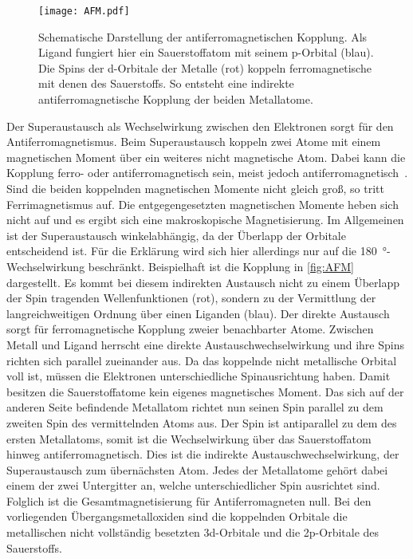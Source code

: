         \begin{figure}[H]
            \centering
            \texttt{[image: AFM.pdf]}
            \caption{Schematische Darstellung der antiferromagnetischen Kopplung.
            Als Ligand fungiert hier ein Sauerstoffatom mit seinem p-Orbital (blau).
            Die Spins der d-Orbitale der Metalle (rot) koppeln ferromagnetische mit denen des Sauerstoffs.
            So entsteht eine indirekte antiferromagnetische Kopplung der beiden Metallatome.}
            \label{fig:AFM}
        \end{figure}
        Der Superaustausch als Wechselwirkung zwischen den Elektronen sorgt für den Antiferromagnetismus.
        Beim Superaustausch koppeln zwei Atome mit einem magnetischen Moment über ein weiteres nicht magnetische Atom. 
        Dabei kann die Kopplung ferro- oder antiferromagnetisch sein, meist jedoch antiferromagnetisch~\cite{AFM_1}.
        Sind die beiden koppelnden magnetischen Momente nicht gleich groß, so tritt Ferrimagnetismus auf.
        Die entgegengesetzten magnetischen Momente heben sich nicht auf und es ergibt sich eine makroskopische Magnetisierung.
        Im Allgemeinen ist der Superaustausch winkelabhängig, da der Überlapp der Orbitale entscheidend ist.
        Für die Erklärung wird sich hier allerdings nur auf die \SI{180}{\degree}-Wechselwirkung beschränkt.
        Beispielhaft ist die Kopplung in \autoref{fig:AFM} dargestellt.
        Es kommt bei diesem indirekten Austausch nicht zu einem Überlapp der Spin tragenden Wellenfunktionen (rot), sondern zu der Vermittlung der langreichweitigen Ordnung über einen Liganden (blau).
        Der direkte Austausch sorgt für ferromagnetische Kopplung zweier benachbarter Atome.
        Zwischen Metall und Ligand herrscht eine direkte Austauschwechselwirkung und ihre Spins richten sich parallel zueinander aus.
        Da das koppelnde nicht metallische Orbital voll ist, müssen die Elektronen unterschiedliche Spinausrichtung haben.
        Damit besitzen die Sauerstoffatome kein eigenes magnetisches Moment.
        Das sich auf der anderen Seite befindende Metallatom richtet nun seinen Spin parallel zu dem zweiten Spin des vermittelnden Atoms aus.
        Der Spin ist antiparallel zu dem des ersten Metallatoms, somit ist die Wechselwirkung über das Sauerstoffatom hinweg antiferromagnetisch. 
        Dies ist die indirekte Austauschwechselwirkung, der Superaustausch zum übernächsten Atom.
        Jedes der Metallatome gehört dabei einem der zwei Untergitter an, welche unterschiedlicher Spin ausrichtet sind.
        Folglich ist die Gesamtmagnetisierung für Antiferromagneten null.
        Bei den vorliegenden Übergangsmetalloxiden sind die koppelnden Orbitale die metallischen nicht vollständig besetzten 3d-Orbitale und die 2p-Orbitale des Sauerstoffs.
        

